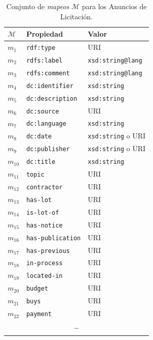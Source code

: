 \begin{longtable}[c]{|p{2cm}|p{8cm}|p{4cm}|} 
\hline
  \textbf{$\mathcal{M}$} &  \textbf{Propiedad} & \textbf{Valor} \\\hline
\endhead
 $m_1$ & \texttt{rdf:type} & URI \\ \hline
 $m_{2}$ & \texttt{rdfs:label} & \texttt{xsd:string@lang} \\ \hline
 $m_{3}$ & \texttt{rdfs:comment} & \texttt{xsd:string@lang} \\ \hline
 $m_4$ & \texttt{dc:identifier} & \texttt{xsd:string} \\ \hline
 $m_5$ & \texttt{dc:description} & \texttt{xsd:string} \\ \hline
 $m_6$ & \texttt{dc:source} & URI \\ \hline
 $m_7$ & \texttt{dc:language} & \texttt{xsd:string} \\ \hline
 $m_8$ & \texttt{dc:date} & \texttt{xsd:string} o URI \\ \hline
 $m_9$ & \texttt{dc:publisher} & \texttt{xsd:string} o URI\\ \hline
 $m_{10}$ & \texttt{dc:title} & \texttt{xsd:string} \\ \hline
 $m_{11}$ & \texttt{topic} & URI \\ \hline
 $m_{12}$ & \texttt{contractor} & URI \\ \hline
 $m_{13}$ & \texttt{has-lot} & URI \\ \hline
 $m_{14}$ & \texttt{is-lot-of} & URI \\ \hline
 $m_{15}$ & \texttt{has-notice} & URI \\ \hline
 $m_{16}$ & \texttt{has-publication} & URI \\ \hline
 $m_{17}$ & \texttt{has-previous} & URI \\ \hline
 $m_{18}$ & \texttt{in-process} & URI \\ \hline
 $m_{19}$ & \texttt{located-in} & URI \\ \hline
 $m_{20}$ & \texttt{budget} & URI \\ \hline
 $m_{21}$ & \texttt{buys} & URI \\ \hline
 $m_{22}$ & \texttt{payment} & URI \\ \hline
  \multicolumn{3}{|c|}{\ldots} \\ \hline  
\hline
\caption{Conjunto de \textit{mapeos} $\mathcal{M}$ para los Anuncios de Licitación.}\label{tabla:produccion-ppn}\\    
\end{longtable}
% 
